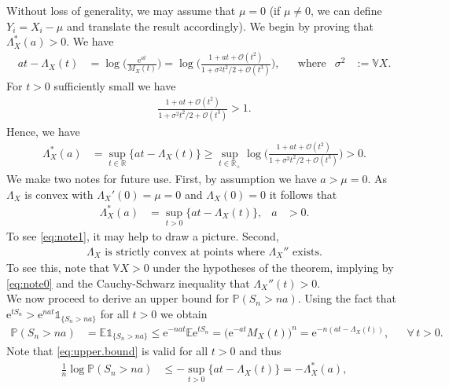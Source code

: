 \documentclass[12pt]{book}
\numberwithin{equation}{chapter}
\theoremstyle{plain}
\numberwithin{theorem}{section}
\theoremstyle{definition}
\numberwithin{exercise}{chapter}
\let\oldendproof\endproof
\renewenvironment{proof}[1][\proofname]{%
  \oldproof[\scshape\underline{#1}]%
}{\oldendproof}
\newcommand{\<}{\langle}
\renewcommand{\>}{\rangle}
\renewcommand{\(}{\left(}
\renewcommand{\)}{\right)}
\renewcommand{\[}{\left[}
\renewcommand{\]}{\right]}
\newcommand\Eb{\mathds{E}}
\newcommand\Ib{\mathds{1}} 	%
\newcommand\Pb{\mathds{P}}
\newcommand\Rb{\mathds{R}}
\newcommand\Vb{\mathds{V}}
\newcommand\Oc{\mathscr{O}}
\newcommand\sig{\sigma}
\newcommand\Lam{\Lambda}
\newcommand\ee{\mathrm{e}}
\begin{document}
\begin{proof}[Proof of Theorem \ref{thm:ldp}]
Without loss of generality, we may assume that $\mu = 0$ (if $\mu \neq 0$, we can define $Y_i = X_i - \mu$ and translate the result accordingly).
We begin by proving that $\Lam_X^*(a) > 0$.  We have
\begin{align}
a t - \Lam_X(t)
	&=	\log \Big( \frac{\ee^{at}}{M_X(t)} \Big)
	=		\log \Big( \frac{1 + a t + \Oc(t^2)}{1 + \sig^2 t^2 / 2 + \Oc(t^3)} \Big) , &
	&\text{where}&
\sig^2
	&:= \Vb X .
\end{align}
For $t>0$ sufficiently small we have
\begin{align}
\frac{1 + a t + \Oc(t^2)}{1 + \sig^2 t^2 / 2 + \Oc(t^3)}
	> 1 .
\end{align}
Hence, we have
\begin{align}
\Lam_X^*(a)
	&=	\sup_{t \in \Rb} \{ a t - \Lam_X(t) \}
	\geq \sup_{t \in \Rb_+} \log \Big( \frac{1 + a t + \Oc(t^2)}{1 + \sig^2 t^2 / 2 + \Oc(t^3)} \Big)
	> 0 .
\end{align}
We make two notes for future use.  First, by assumption we have $a > \mu = 0$.  As $\Lam_X$ is convex with $\Lam_X'(0) = \mu = 0$ and $\Lam_X(0) = 0$ it follows that
\begin{align}
\Lam_X^*(a) 
	&= \sup_{t > 0 } \{ a t - \Lam_X(t) \} , &
a
	&> 0 . \label{eq:note1}
\end{align}
To see \eqref{eq:note1}, it may help to draw a picture.  Second, 
\begin{align}
	\text{$\Lam_X$ is strictly convex at points where $\Lam_X''$ exists}. \label{eq:note2}
\end{align}
To see this, note that $\Vb X > 0$ under the hypotheses of the theorem, implying by \eqref{eq:note0} and the Cauchy-Schwarz inequality that $\Lam_X''(t) > 0$.
\\[0.5em]
We now proceed to derive an upper bound for $\Pb( S_n > n a )$.  Using the fact that $\ee^{t S_n} > \ee^{n a t} \Ib_{\{S_n > n a\}}$ for all $t>0$ we obtain
\begin{align}
\Pb( S_n > n a )
	&=	\Eb \Ib_{\{S_n > n a\}}
	\leq \ee^{- n a t} \Eb \ee^{t S_n}
	=	\Big( \ee^{-a t} M_X(t) \Big)^n 
	=	\ee^{-n (a t - \Lam_X(t))} , &
	&\forall \, t > 0 . \label{eq:upper.bound}
\end{align}
Note that \eqref{eq:upper.bound} is valid for all $t > 0$ and thus
\begin{align}
\frac{1}{n} \log \Pb(S_n > na) 
	&\leq - \sup_{t > 0} \{ at - \Lam_X(t) \} 
	=	- \Lam_X^*(a) , \label{eq:ldp.ub}
\end{align}

\end{proof}
\end{document}
